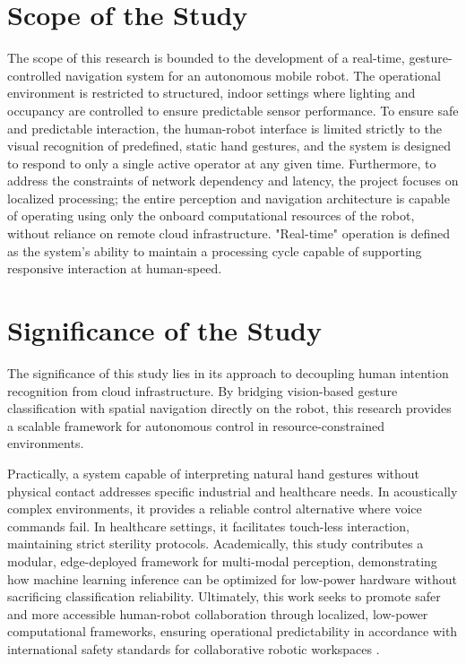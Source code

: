 \section{Scope of the Study}
The scope of this research is bounded to the development of a real-time, gesture-controlled navigation system for an autonomous mobile robot. The operational environment is restricted to structured, indoor settings where lighting and occupancy are controlled to ensure predictable sensor performance. To ensure safe and predictable interaction, the human-robot interface is limited strictly to the visual recognition of predefined, static hand gestures, and the system is designed to respond to only a single active operator at any given time. Furthermore, to address the constraints of network dependency and latency, the project focuses on localized processing; the entire perception and navigation architecture is capable of operating using only the onboard computational resources of the robot, without reliance on remote cloud infrastructure. "Real-time" operation is defined as the system’s ability to maintain a processing cycle capable of supporting responsive interaction at human-speed.

\section{Significance of the Study}
The significance of this study lies in its approach to decoupling human intention recognition from cloud infrastructure. By bridging vision-based gesture classification with spatial navigation directly on the robot, this research provides a scalable framework for autonomous control in resource-constrained environments. 

Practically, a system capable of interpreting natural hand gestures without physical contact addresses specific industrial and healthcare needs. In acoustically complex environments, it provides a reliable control alternative where voice commands fail. In healthcare settings, it facilitates touch-less interaction, maintaining strict sterility protocols. Academically, this study contributes a modular, edge-deployed framework for multi-modal perception, demonstrating how machine learning inference can be optimized for low-power hardware without sacrificing classification reliability. Ultimately, this work seeks to promote safer and more accessible human-robot collaboration through localized, low-power computational frameworks, ensuring operational predictability in accordance with international safety standards for collaborative robotic workspaces \cite{iso150662016}.

